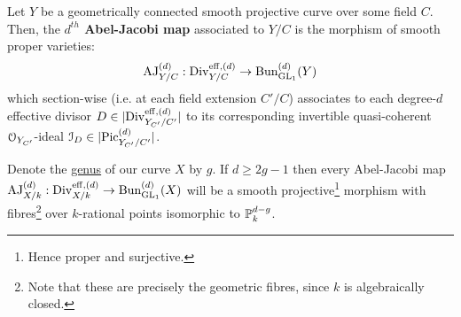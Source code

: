         \begin{definition} \label{def: the_abel_jacobi_map}
            Let $Y$ be a geometrically connected smooth projective curve over some field $C$. Then, the \textbf{$d^{th}$ Abel-Jacobi map} associated to $Y/C$ is the morphism of smooth proper varieties:
                $$\AJ_{Y/C}^{(d)}: \Div_{Y/C}^{\eff, (d)} \to \Bun_{\GL_1}^{(d)}(Y)$$
            which section-wise (i.e. at each field extension $C'/C$) associates to each degree-$d$ effective divisor $D \in |\Div_{Y_{C'}/C'}^{\eff, (d)}|$ to its corresponding invertible quasi-coherent $\calO_{Y_{C'}}$-ideal $\calI_D \in |\Pic_{Y_{C'}/C'}^{(d)}|$.
        \end{definition}
        \begin{proposition} \label{prop: the_abel_jacobi_map_is_a_smooth_projective_fibration}
            Denote the \href{https://stacks.math.columbia.edu/tag/0BY6}{\underline{genus}} of our curve $X$ by $g$. If $d \geq 2g - 1$ then every Abel-Jacobi map $\AJ_{X/k}^{(d)}: \Div_{X/k}^{\eff, (d)} \to \Bun_{\GL_1}^{(d)}(X)$ will be a smooth projective\footnote{Hence proper and surjective.} morphism with fibres\footnote{Note that these are precisely the geometric fibres, since $k$ is algebraically closed.} over $k$-rational points isomorphic to $\P^{d - g}_k$.
        \end{proposition}
